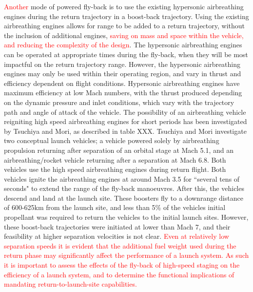 \textcolor{red}{Another} mode of powered fly-back is to use the existing hypersonic airbreathing engines during the return trajectory in a boost-back trajectory. Using the existing airbreathing engines allows for range to be added to a return trajectory, without the inclusion of additional engines, \textcolor{red}{saving on mass and space within the vehicle, and reducing the complexity of the design}. The hypersonic airbreathing engines can be operated at appropriate times during the fly-back, when they will be most impactful on the return trajectory range. However, the hypersonic airbreathing engines may only be used within their operating region, and vary in thrust and efficiency dependent on flight conditions. Hypersonic airbreathing engines have maximum efficiency at low Mach numbers\cite{Preller2017b}, with the thrust produced depending on the dynamic pressure and inlet conditions, which vary with the trajectory path and angle of attack of the vehicle. 
The possibility of an airbreathing vehicle reigniting high speed airbreathing engines for short periods has been investigated by Tsuchiya and Mori\cite{Tsuchiya2005}, as described in table XXX.  Tsuchiya and Mori investigate two conceptual launch vehicles; a vehicle powered solely by airbreathing propulsion returning after separation of an orbital stage at Mach 5.1, and an airbreathing/rocket vehicle returning after a separation at Mach 6.8\cite{Tsuchiya2005}.  Both vehicles use the high speed airbreathing engines during return flight. Both vehicles ignite the airbreathing engines at around Mach 3.5 for ``several tens of seconds" to extend the range of the fly-back manoeuvres. After this, the vehicles descend and land at the launch site. 
These boosters fly to a downrange distance of 600-625km from the launch site, and less than 5\% of the vehicles initial propellant was required to return the vehicles to the initial launch sites\cite{Tsuchiya2005}. However, these boost-back trajectories were initiated at lower than Mach 7, and their feasibility at higher separation velocities is not clear.
\textcolor{red}{Even at relatively low separation speeds it is evident that the additional fuel weight used during the return phase may significantly affect the performance of a launch system. As such it is important to assess the effects of the fly-back of high-speed staging on the efficiency of a launch system, and to determine the functional implications of mandating return-to-launch-site capabilities. }



